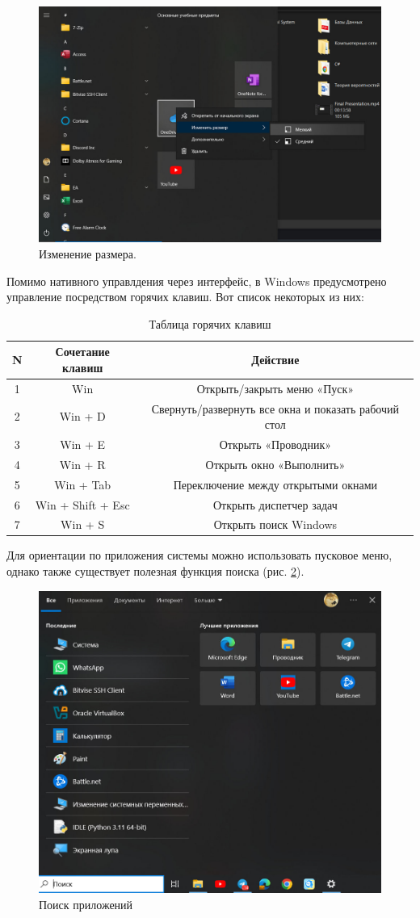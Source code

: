 \begin{figure}
    \centering
    \includegraphics[width=0.5\linewidth]{Pic/lab1/photo_2025-05-21_08-15-04.jpg}
    \caption{Изменение размера.}
    \label{fig:scalevid}
\end{figure}

Помимо нативного управлдения через интерфейс, в Windows предусмотрено управление посредством горячих клавиш. Вот список некоторых из них:
\begin{table}[h!]
    \centering
    \caption{Таблица горячих клавиш}
    \label{tab:tab 1.1}
    \vspace{10}
    \begin{tabular}{|c|c|c|}
\hline
N&Сочетание клавиш&Действие\\
\hline
1&Win&Открыть/закрыть меню «Пуск»\\
\hline
2&Win + D&Свернуть/развернуть все окна и показать рабочий стол\\
\hline
3&Win + E&Открыть «Проводник»\\
\hline
4&Win + R&Открыть окно «Выполнить»\\
\hline
5&Win + Tab&Переключение между открытыми окнами\\
\hline
6&Win + Shift + Esc&Открыть диспетчер задач\\
\hline
7&Win + S&Открыть поиск Windows\\
\hline
    \end{tabular}
\end{table}

Для ориентации по приложения системы можно использовать пусковое меню, однако также существует полезная функция поиска (рис. \ref{fig:findapp}).
\begin{figure}
    \centering
    \includegraphics[width=0.5\linewidth]{Pic/lab1/photo_2025-05-21_08-15-11.jpg}
    \caption{Поиск приложений}
    \label{fig:findapp}
\end{figure}

